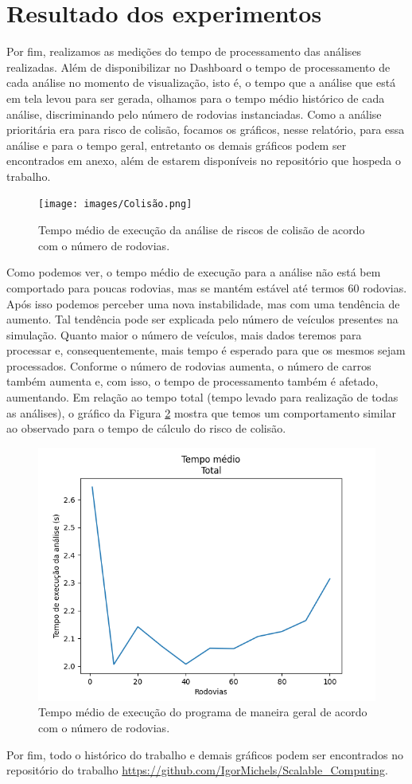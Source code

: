 \documentclass{article}
\begin{document}
\section*{Resultado dos experimentos}

Por fim, realizamos as medições do tempo de processamento das análises realizadas. Além de disponibilizar no Dashboard o tempo de processamento de cada análise no momento de visualização, isto é, o tempo que a análise que está em tela levou para ser gerada, olhamos para o tempo médio histórico de cada análise, discriminando pelo número de rodovias instanciadas. Como a análise prioritária era para risco de colisão, focamos os gráficos, nesse relatório, para essa análise e para o tempo geral, entretanto os demais gráficos podem ser encontrados em anexo, além de estarem disponíveis no repositório que hospeda o trabalho.
\begin{figure}[H]
    \centering
    \texttt{[image: images/Colisão.png]}
    \caption{Tempo médio de execução da análise de riscos de colisão de acordo com o número de rodovias.}
    \label{colision_time}
\end{figure}

Como podemos ver, o tempo médio de execução para a análise não está bem comportado para poucas rodovias, mas se mantém estável até termos 60 rodovias. Após isso podemos perceber uma nova instabilidade, mas com uma tendência de aumento. Tal tendência pode ser explicada pelo número de veículos presentes na simulação. Quanto maior o número de veículos, mais dados teremos para processar e, consequentemente, mais tempo é esperado para que os mesmos sejam processados. Conforme o número de rodovias aumenta, o número de carros também aumenta e, com isso, o tempo de processamento também é afetado, aumentando. Em relação ao tempo total (tempo levado para realização de todas as análises), o gráfico da Figura \ref{total_time} mostra que temos um comportamento similar ao observado para o tempo de cálculo do risco de colisão.

\begin{figure}[H]
    \centering
    \includegraphics[scale = 0.6]{images/Total.png	}
    \caption{Tempo médio de execução do programa de maneira geral de acordo com o número de rodovias.}
    \label{total_time}
\end{figure}

Por fim, todo o histórico do trabalho e demais gráficos podem ser encontrados no repositório do trabalho \url{https://github.com/IgorMichels/Scalable_Computing}.
\end{document}
